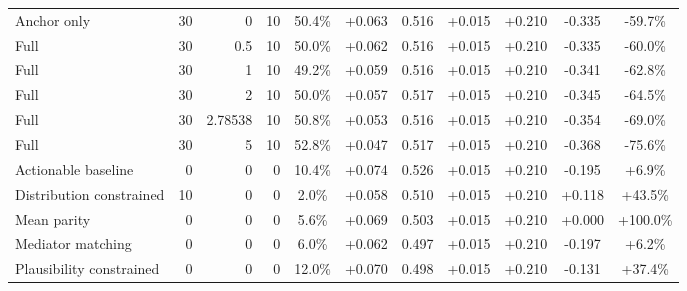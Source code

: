 \begin{table}[htbp]
\begin{tabular}{lrrrccccccc}
Anchor only & 30 & 0 & 10 & 50.4\% & +0.063 & 0.516 & +0.015 & +0.210 & -0.335 & -59.7\% \\
Full & 30 & 0.5 & 10 & 50.0\% & +0.062 & 0.516 & +0.015 & +0.210 & -0.335 & -60.0\% \\
Full & 30 & 1 & 10 & 49.2\% & +0.059 & 0.516 & +0.015 & +0.210 & -0.341 & -62.8\% \\
Full & 30 & 2 & 10 & 50.0\% & +0.057 & 0.517 & +0.015 & +0.210 & -0.345 & -64.5\% \\
Full & 30 & 2.78538 & 10 & 50.8\% & +0.053 & 0.516 & +0.015 & +0.210 & -0.354 & -69.0\% \\
Full & 30 & 5 & 10 & 52.8\% & +0.047 & 0.517 & +0.015 & +0.210 & -0.368 & -75.6\% \\
Actionable baseline & 0 & 0 & 0 & 10.4\% & +0.074 & 0.526 & +0.015 & +0.210 & -0.195 & +6.9\% \\
Distribution constrained & 10 & 0 & 0 & 2.0\% & +0.058 & 0.510 & +0.015 & +0.210 & +0.118 & +43.5\% \\
Mean parity & 0 & 0 & 0 & 5.6\% & +0.069 & 0.503 & +0.015 & +0.210 & +0.000 & +100.0\% \\
Mediator matching & 0 & 0 & 0 & 6.0\% & +0.062 & 0.497 & +0.015 & +0.210 & -0.197 & +6.2\% \\
Plausibility constrained & 0 & 0 & 0 & 12.0\% & +0.070 & 0.498 & +0.015 & +0.210 & -0.131 & +37.4\% \\
\bottomrule
\end{tabular}
\end{table}